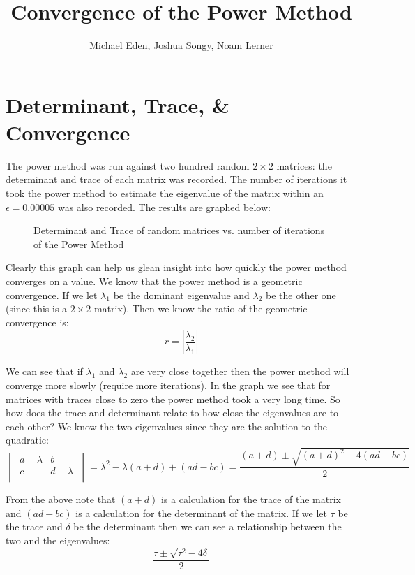 \documentclass{article}
\title{Convergence of the Power Method}
\author{Michael Eden, Joshua Songy, Noam Lerner}
\begin{document}
\maketitle{}

\section{Determinant, Trace, \& Convergence}

The power method was run against two hundred random $2 \times 2$ matrices: the determinant and
trace of each matrix was recorded.
The number of iterations it took the power method to estimate the eigenvalue of the matrix
within an $\epsilon = 0.00005$ was also recorded. The results are graphed below:

\begin{figure}[h]
    \centering
    
    \caption{Determinant and Trace of random matrices vs. number of iterations of the Power Method}
\end{figure}

\pagebreak

Clearly this graph can help us glean insight into how quickly the power method converges on
a value. We know that the power method is a geometric convergence. If we let $\lambda_1$ be
the dominant eigenvalue and $\lambda_2$ be the other one (since this is a $2 \times 2$ matrix).
Then we know the ratio of the geometric convergence is:
$$
r = \left| \frac{\lambda_2}{\lambda_1} \right|
$$

We can see that if $\lambda_1$ and $\lambda_2$ are very close together then the power method
will converge more slowly (require more iterations). In the graph we see that for matrices
with traces close to zero the power method took a very long time. So how does the trace
and determinant relate to how close the eigenvalues are to each other? We know the two
eigenvalues since they are the solution to the quadratic:
$$
\begin{vmatrix}
    ~a - \lambda & b~ \\
    ~c & d - \lambda~ \\
\end{vmatrix} = \lambda^2 - \lambda(a + d) + (ad - bc)
= \frac{ (a + d) \pm \sqrt{(a + d)^2 - 4(ad - bc)} }{2}
$$

From the above note that $(a + d)$ is a calculation for the trace of the matrix and
$(ad - bc)$ is a calculation for the determinant of the matrix. If we let $\tau$ be the
trace and $\delta$ be the determinant then we can see a relationship between the two
and the eigenvalues:
$$
\frac{ \tau \pm \sqrt{\tau^2 - 4\delta} }{2}
$$
\end{document}
